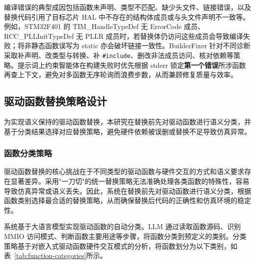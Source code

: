 编译错误的典型成因包括函数未声明、类型不匹配、缺少头文件、链接错误，以及替换代码引用了目标芯片 HAL 中不存在的结构体成员或与头文件声明不一致等。例如，STM32F401 的 TIM\_HandleTypeDef 无 ErrorCode 成员、RCC\_PLLInitTypeDef 无 PLLR 成员时，若替换体仍访问这些成员会导致编译失败；将非静态函数误写为 static 亦会破坏链接一致性。BuilderFixer 针对不同诊断采取补声明、改类型与转换、补 \texttt{\#include}、删改非法成员访问、核对依赖等策略。提示词上约束智能体在构建失败时优先根据 stderr 锁定\textbf{第一个错误}所涉函数再查上下文，避免对多函数无序轮询而浪费步数，从而兼顾修复质量与效率。

\subsection{驱动函数替换策略设计}
\label{sec:driver-replacement-strategy}

为实现语义保持的驱动函数替换，本研究在替换前先对驱动函数进行语义分类，并基于分类结果选择对应替换策略，避免硬件依赖被误删或替换不足导致仿真异常。

\subsubsection{函数分类策略}

驱动函数替换的核心挑战在于不同类型的驱动函数与硬件交互的方式和语义要求存在显著差异。采用"一刀切"的统一替换策略无法准确处理各类函数的特殊性，容易导致仿真异常或语义丢失。因此，系统在替换前先对驱动函数进行语义分类，根据函数类别选择最合适的替换策略，从而确保替换后代码的正确性和仿真环境的稳定性。

系统基于大语言模型实现驱动函数的自动分类。LLM 通过读取函数源码、识别 MMIO 访问模式、判断函数主要用途等步骤，将函数分类到预定义的类别。分类策略基于对嵌入式驱动函数硬件交互模式的分析，将函数划分为以下类别，如表~\ref{tab:function-categories}所示。

